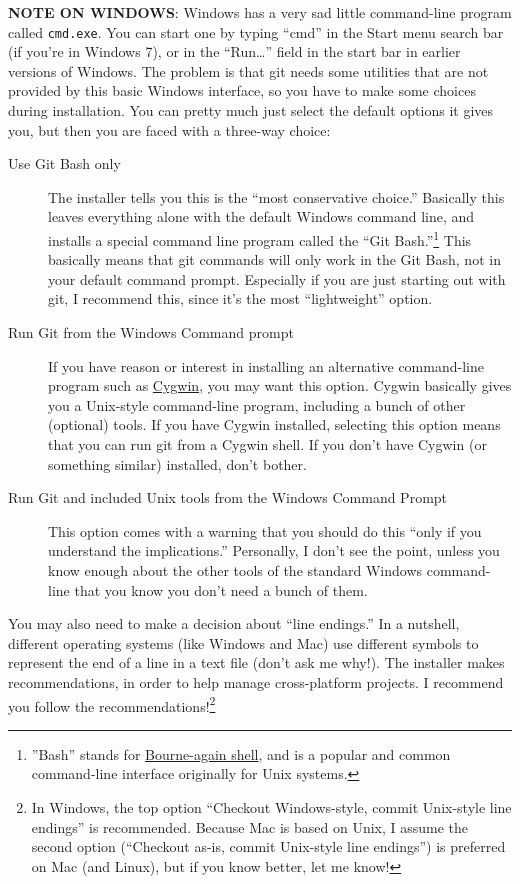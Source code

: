 \documentclass[11pt]{article}
\begin{document}
\textbf{NOTE ON WINDOWS}: Windows has a very sad little command-line program called \texttt{cmd.exe}. You can start one by typing ``cmd'' in the Start menu search bar (if you're in Windows 7), or in the ``Run\ldots{}'' field in the start bar in earlier versions of Windows. The problem is that git needs some utilities that are not provided by this basic Windows interface, so you have to make some choices during installation. You can pretty much just select the default options it gives you, but then you are faced with a three-way choice:
\begin{description}
\item[Use Git Bash only] The installer tells you this is the ``most conservative choice.'' Basically this leaves everything alone with the default Windows command line, and installs a special command line program called the ``Git Bash.''\footnote{''Bash'' stands for \href{http://en.wikipedia.org/wiki/Bash_(Unix_shell)}{Bourne-again shell}, and is a popular and common command-line interface originally for Unix systems.
 } This basically means that git commands will only work in the Git Bash, not in your default command prompt.  Especially if you are just starting out with git, I recommend this, since it's the most ``lightweight'' option.
\item[Run Git from the Windows Command prompt] If you have reason or interest in installing an alternative command-line program such as \href{http://www.cygwin.com/}{Cygwin}, you may want this option. Cygwin basically gives you a Unix-style command-line program, including a bunch of other (optional) tools. If you have Cygwin installed, selecting this option means that you can run git from a Cygwin shell.  If you don't have Cygwin (or something similar) installed, don't bother.
\item[Run Git and included Unix tools from the Windows Command Prompt] This option comes with a warning that you should do this ``only if you understand the implications.'' Personally, I don't see the point, unless you know enough about the other tools of the standard Windows command-line that you know you don't need a bunch of them.
\end{description}

You may also need to make a decision about ``line endings.'' In a nutshell, different operating systems (like Windows and Mac) use different symbols to represent the end of a line in a text file (don't ask me why!). The installer makes recommendations, in order to help manage cross-platform projects.  I recommend you follow the recommendations!\footnote{In Windows, the top option ``Checkout Windows-style, commit Unix-style line endings'' is recommended. Because Mac is based on Unix, I assume the second option (``Checkout as-is, commit Unix-style line endings'') is preferred on Mac (and Linux), but if you know better, let me know!
 }
\end{document}

